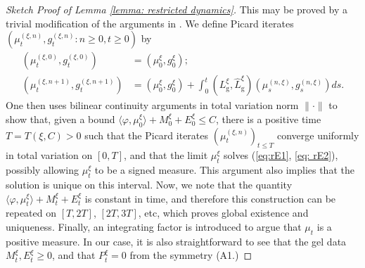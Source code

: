 \begin{proof}[Sketch Proof of Lemma \ref{lemma: restricted dynamics}]This may be proved by a trivial modification of the arguments in \cite[Proposition 2.2]{N99}. We define Picard iterates $(\mu^{(\xi,n)}_t, g^{(\xi,n)}_t: n\ge 0, t\ge 0)$ by \begin{align} (\mu^{(\xi,0)}_t, g^{(\xi,0)}_t)&=(\mu^\xi_0, g^\xi_0);\\ \left(\mu^{(\xi,n+1)}_t, g^{(\xi,n+1)}_t\right)&=(\mu^\xi_0,g^\xi_0)+\int_0^t (L^\xi_\mathrm{g}, \widehat{L}^\xi_\mathrm{g})\left(\mu^{(n,\xi)}_s, g^{(n,\xi)}_s\right) ds. \end{align} One then uses bilinear continuity arguments in total variation norm $\|\cdot\|$ to show that, given a bound $\langle \varphi, \mu^\xi_0\rangle +M^\xi_0+E^\xi_0\le C$, there is a positive time $T=T(\xi,C)>0$ such that the Picard iterates $(\mu^{(\xi,n)}_t)_{t\le T}$ converge uniformly in total variation on $[0,T]$, and that the limit $\mu^\xi_t$ solves (\ref{eq:rE1}, \ref{eq: rE2}), possibly allowing $\mu^\xi_t$ to be a signed measure. This argument also implies that the solution is unique on this interval. Now, we note that the quantity $\langle \varphi, \mu^\xi_t\rangle +M^\xi_t+E^\xi_t$ is constant in time, and therefore this construction can be repeated on $[T, 2T]$, $[2T, 3T]$, etc, which proves global existence and uniqueness. Finally, an integrating factor is introduced to argue that $\mu_t$ is a positive measure.
In our case, it is also straightforward to see that the gel data $M^\xi_t, E^\xi_t \ge 0$, and that $P^\xi_t=0$ from the symmetry ({A1}.)
\end{proof}

